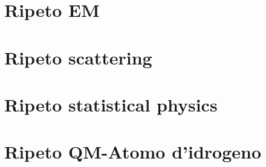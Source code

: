 \part{Ripeto EM}

\part{Ripeto scattering}

\part{Ripeto statistical physics}

\part{Ripeto QM-Atomo d'idrogeno}

%

